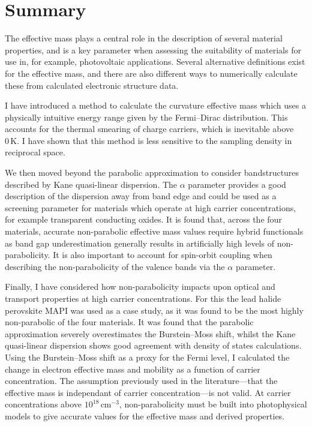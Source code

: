 \section{Summary}

The effective mass plays a central role in the description of several material properties, and is a key parameter when assessing the suitability of materials for use in, for example, photovoltaic applications. 
Several alternative definitions exist for the effective mass, and there are also different ways to numerically calculate these from calculated electronic structure data.

I have introduced a method to calculate the curvature effective mass which uses a physically intuitive energy range given by the Fermi--Dirac distribution. This accounts for the thermal smearing of charge carriers, which is inevitable above $0\,\mathrm{K}$.
I have shown that this method is less sensitive to the sampling density in reciprocal space.

We then moved beyond the parabolic approximation to consider bandstructures described by Kane quasi-linear dispersion.
The $\alpha$ parameter provides a good description of the dispersion away from band edge and could be used as a screening parameter for materials which operate at high carrier concentrations, for example transparent conducting oxides.
It is found that, across the four materials, accurate non-parabolic effective mass values require hybrid functionals as band gap underestimation generally results in artificially high levels of non-parabolicity.
It is also important to account for spin-orbit coupling when describing the non-parabolicity of the valence bands via the $\alpha$ parameter.

Finally, I have considered how non-parabolicity impacts upon optical and transport properties at high carrier concentrations.
For this the lead halide perovskite MAPI was used as a case study, as it was found to be the most highly non-parabolic of the four materials.
It was found that the parabolic approximation severely overestimates the Burstein--Moss shift, 
whilst the Kane quasi-linear dispersion shows good agreement with density of states calculations. 
Using the Burstein--Moss shift as a proxy for the Fermi level, I calculated the change in electron effective mass and mobility as a function of carrier concentration. 
The assumption previously used in the literature---that the effective mass is independant of carrier concentration---is not valid.
At carrier concentrations above $10^{18}\,\mathrm{cm}^{-3}$, non-parabolicity must be built into photophysical models to give accurate values for the effective mass and derived properties.

